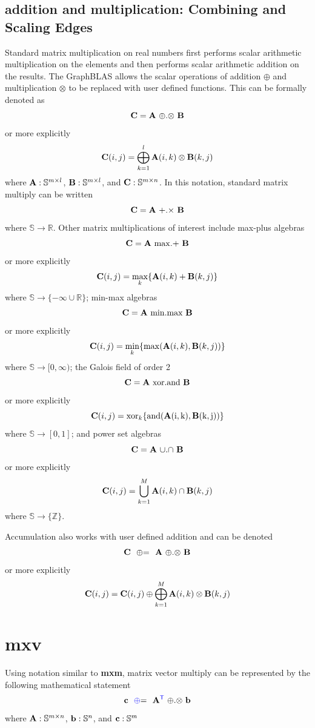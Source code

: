 \subsection{addition and multiplication: Combining and Scaling Edges}
  Standard matrix multiplication on real numbers first performs scalar arithmetic multiplication on the elements and then performs scalar arithmetic addition on the results.  The GraphBLAS allows the scalar operations of addition $\oplus$ and multiplication $\otimes$ to be replaced with user defined functions.  This can be formally denoted as
$$
   {\bf C} = {\bf A} ~ {\oplus}.{\otimes} ~ {\bf B}
$$
or more explicitly
$$
   {\bf C}(i,j) = \bigoplus_{k=1}^l {\bf A}(i,k) \otimes {\bf B}(k,j)
$$
where ${\bf A}: \mathbb{S}^{m \times l}$,  ${\bf B}: \mathbb{S}^{m \times l}$, and ${\bf C}: \mathbb{S}^{m \times n}$.  In this notation, standard matrix multiply can be written
$$
   {\bf C} = {\bf A} ~ {+}.{\times} ~ {\bf B}
$$
where $\mathbb{S} \rightarrow \mathbb{R}$. Other matrix multiplications of interest include max-plus algebras
$$
   {\bf C} = {\bf A} ~ {\max}.{+} ~ {\bf B}
$$
or more explicitly
$$
   {\bf C}(i,j) = \max_k \{{\bf A}(i,k) + {\bf B}(k,j)\}
$$
where $\mathbb{S} \rightarrow \{-\infty \cup \mathbb{R}\}$; min-max algebras
$$
   {\bf C} = {\bf A} ~ {\min}.{\max} ~ {\bf B}
$$
or more explicitly
$$
   {\bf C}(i,j) = \min_k \{\max({\bf A}(i,k),{\bf B}(k,j))\}
$$
where $\mathbb{S} \rightarrow [0,\infty)$; the Galois field of order 2
$$
   {\bf C} = {\bf A} ~ {\rm xor}.{\rm and} ~ {\bf B}
$$
or more explicitly
$$
   {\bf C}(i,j) = {\rm xor}_k \{\rm and({\bf A}(i,k),{\bf B}(k,j))\}
$$
where $\mathbb{S} \rightarrow [0,1]$; and power set algebras
$$
   {\bf C} = {\bf A} ~ {\cup}.{\cap} ~ {\bf B}
$$
or more explicitly
$$
   {\bf C}(i,j) = \bigcup_{k=1}^M {\bf A}(i,k) \cap {\bf B}(k,j)
$$
where $\mathbb{S} \rightarrow \{\mathbb{Z}\}$.

  Accumulation also works with user defined addition and can be denoted
$$
   {\bf C} ~~ {\oplus}{=} ~~ {\bf A} ~ {\oplus}.{\otimes} ~ {\bf B}
$$
or more explicitly
$$
   {\bf C}(i,j) = {\bf C}(i,j) \oplus \bigoplus_{k=1}^M {\bf A}(i,k) \otimes {\bf B}(k,j)
$$

\section{mxv}
  Using notation similar to {\bf mxm}, matrix vector multiply can be represented by the following mathematical statement
$$
   {\bf c} ~~ {\textcolor{blue}{\oplus}}{=} ~~ {\bf A}^{\textcolor{blue}{\sf T}} ~ {\oplus}.{\otimes} ~ {\bf b}
$$
where  ${\bf A}: \mathbb{S}^{m \times n}$,  ${\bf b}: \mathbb{S}^{n}$, and ${\bf c}: \mathbb{S}^{m}$

